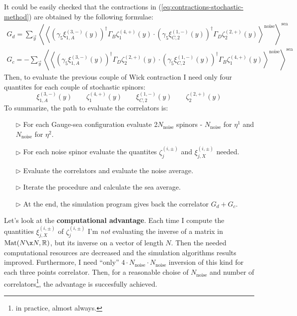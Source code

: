 \documentclass[english, LaM, oneside, noexaminfo]{sapthesis}
\begin{document}
It could be easily checked that the contractions in (\ref{eq:contractions-stochastic-method}) are obtained by the following formulae:
\begin{equation}\label{eq:noise-method}
    \begin{gathered}
        G_d =   \sum_{\vec y} \left\langle \left\langle \left(\gamma_5\xi^{(3,-)}_{1,A} (y) \right)^\dag \Gamma_B \zeta^{(4,+)}_1 (y) \cdot \left(\gamma_5\xi^{(1,-)}_{C,2} (y) \right)^\dag \Gamma_D \zeta^{(2,+)}_2 (y) \right\rangle^\text{noise} \right\rangle^{\text{sea}} \\
        G_c = - \sum_{\vec y} \left\langle \left\langle \left(\gamma_5\xi^{(3,-)}_{1,A} (y) \right)^\dag \Gamma_D \zeta^{(2,+)}_2 (y) \cdot \left(\gamma_5\xi^{(1,-)}_{C,2} (y) \right)^\dag \Gamma_B \zeta^{(4,+)}_1 (y) \right\rangle^\text{noise} \right\rangle^{\text{sea}}
    \end{gathered}
\end{equation}
Then, to evaluate the previous couple of Wick contraction I need only four quantites for each couple of stochastic spinors:
\begin{equation*}
    \xi^{(3,-)}_{1,A} (y) \qquad  \zeta^{(4,+)}_1 (y) \qquad \xi^{(1,-)}_{C,2} (y) \qquad  \zeta^{(2,+)}_2 (y)
\end{equation*}
To summarize, the path to evaluate the correlators is:
\begin{itemize}
    \item [$\triangleright$] For each Gauge-sea configuration evaluate 2$N_{\text{noise}}$ spinors - $N_{\text{noise}}$ for $\eta^1$ and $N_{\text{noise}}$ for $\eta^2$. 
    \item [$\triangleright$] For each noise spinor evaluate the quantites $\zeta^{(i,\pm)}_j$ and $\xi^{(i,\pm)}_{j,X}$ needed.
    \item [$\triangleright$] Evaluate the correlators and evaluate the noise average.
    \item [$\triangleright$] Iterate the procedure and calculate the sea average.
    \item [$\triangleright$] At the end, the simulation program gives back the correlator $G_d+G_c$.
\end{itemize}
Let's look at the {\bf computational advantage}.
Each time I compute the quantities $\xi^{(i,\pm)}_{j,X}$ of $\zeta^{(i,\pm)}_j$ I'm {\it not} evaluating the inverse of a matrix in $\text{Mat}(N\x N, \mathbb{R})$, but its inverse on a vector of length $N$.
Then the needed computational resources are decreased and the simulation algorithms results improved.
Furthermore, I need ``only'' $4\cdot N_\text{noise} \cdot N_\text{noise}$ inversion of this kind for each three points correlator.
Then, for a reasonable choise of $N_\text{noise}$ and number of correlators\footnote{in practice, almost always.}, the advantage is succesfully achieved.
\end{document}
